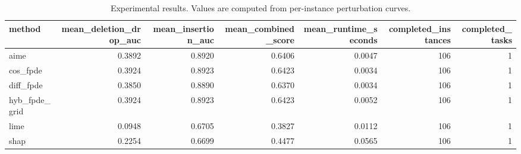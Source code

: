 \begin{table}[t]
\caption{Experimental results. Values are computed from per-instance perturbation curves.}
\label{tab:main_results_computed}
\centering
\begin{tabular}{lrrrrrr}
\toprule
method & mean\_deletion\_drop\_auc & mean\_insertion\_auc & mean\_combined\_score & mean\_runtime\_seconds & completed\_instances & completed\_tasks \\
\midrule
aime & 0.3892 & 0.8920 & 0.6406 & 0.0047 & 106 & 1 \\
cos\_fpde & 0.3924 & 0.8923 & 0.6423 & 0.0034 & 106 & 1 \\
diff\_fpde & 0.3850 & 0.8890 & 0.6370 & 0.0034 & 106 & 1 \\
hyb\_fpde\_grid & 0.3924 & 0.8923 & 0.6423 & 0.0052 & 106 & 1 \\
lime & 0.0948 & 0.6705 & 0.3827 & 0.0112 & 106 & 1 \\
shap & 0.2254 & 0.6699 & 0.4477 & 0.0565 & 106 & 1 \\
\bottomrule
\end{tabular}

\end{table}
